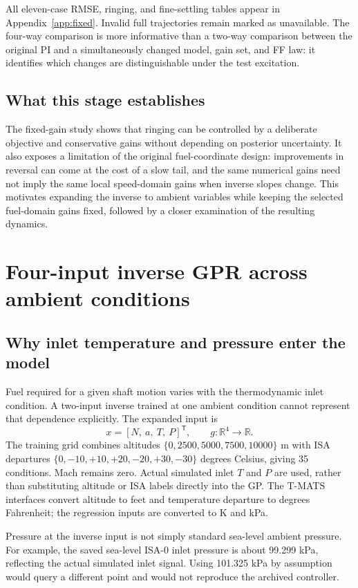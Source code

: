\documentclass[11pt,a4paper,oneside]{report}
\begin{document}
All eleven-case RMSE, ringing, and fine-settling tables appear in Appendix~\ref{app:fixed}. Invalid full trajectories remain marked as unavailable. The four-way comparison is more informative than a two-way comparison between the original PI and a simultaneously changed model, gain set, and FF law: it identifies which changes are distinguishable under the test excitation.

\section{What this stage establishes}
The fixed-gain study shows that ringing can be controlled by a deliberate objective and conservative gains without depending on posterior uncertainty. It also exposes a limitation of the original fuel-coordinate design: improvements in reversal can come at the cost of a slow tail, and the same numerical gains need not imply the same local speed-domain gains when inverse slopes change. This motivates expanding the inverse to ambient variables while keeping the selected fuel-domain gains fixed, followed by a closer examination of the resulting dynamics.

\chapter{Four-input inverse GPR across ambient conditions}
\section{Why inlet temperature and pressure enter the model}
Fuel required for a given shaft motion varies with the thermodynamic inlet condition. A two-input inverse trained at one ambient condition cannot represent that dependence explicitly. The expanded input is
\begin{equation}
x=[N,\ a,\ T,\ P]^\mathsf T,\qquad g:\mathbb R^4\rightarrow\mathbb R.
\end{equation}
The training grid combines altitudes $\{0,2500,5000,7500,10000\}$ m with ISA departures $\{0,-10,+10,+20,-20,+30,-30\}$ degrees Celsius, giving 35 conditions. Mach remains zero. Actual simulated inlet $T$ and $P$ are used, rather than substituting altitude or ISA labels directly into the GP. The T-MATS interfaces convert altitude to feet and temperature departure to degrees Fahrenheit; the regression inputs are converted to K and kPa.

Pressure at the inverse input is not simply standard sea-level ambient pressure. For example, the saved sea-level ISA-0 inlet pressure is about 99.299 kPa, reflecting the actual simulated inlet signal. Using 101.325 kPa by assumption would query a different point and would not reproduce the archived controller.
\end{document}
